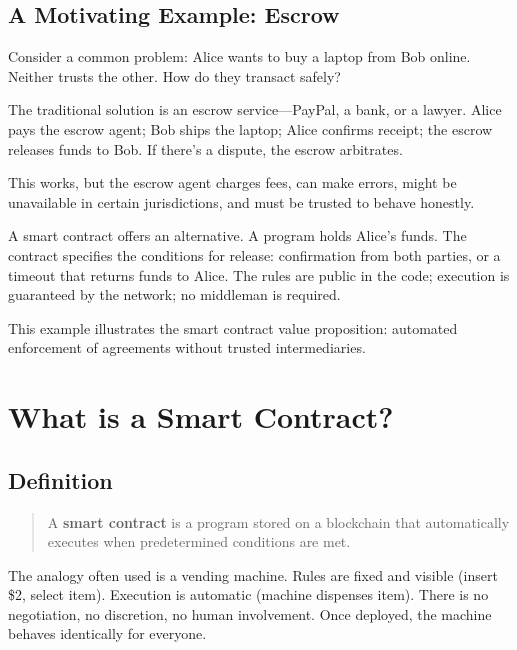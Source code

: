 \documentclass[11pt,a4paper]{article}
\newcommand{\keyword}[1]{\textbf{\textcolor{AccentOrange}{#1}}}
\begin{document}
\subsection{A Motivating Example: Escrow}

Consider a common problem: Alice wants to buy a laptop from Bob online. Neither trusts the other. How do they transact safely?

The traditional solution is an escrow service---PayPal, a bank, or a lawyer. Alice pays the escrow agent; Bob ships the laptop; Alice confirms receipt; the escrow releases funds to Bob. If there's a dispute, the escrow arbitrates.

This works, but the escrow agent charges fees, can make errors, might be unavailable in certain jurisdictions, and must be trusted to behave honestly.

A smart contract offers an alternative. A program holds Alice's funds. The contract specifies the conditions for release: confirmation from both parties, or a timeout that returns funds to Alice. The rules are public in the code; execution is guaranteed by the network; no middleman is required.

This example illustrates the smart contract value proposition: automated enforcement of agreements without trusted intermediaries.

\section{What is a Smart Contract?}

\subsection{Definition}

\begin{quote}
A \keyword{smart contract} is a program stored on a blockchain that automatically executes when predetermined conditions are met.
\end{quote}

The analogy often used is a vending machine. Rules are fixed and visible (insert \$2, select item). Execution is automatic (machine dispenses item). There is no negotiation, no discretion, no human involvement. Once deployed, the machine behaves identically for everyone.
\end{document}
